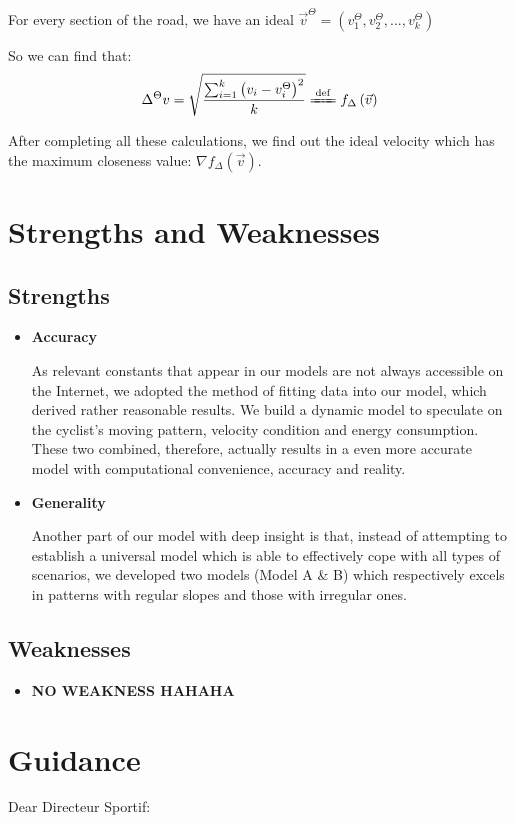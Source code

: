 \documentclass[12pt]{article}
\newcommand{\itembf}{\item \textbf}
\theoremstyle{definition}
\theoremstyle{remark}
\numberwithin{equation}{section}
\begin{document}
	 For every section of the road, we have an ideal $\vec{v}^{\Theta}=\left( v_{1}^{\Theta},v_{2}^{\Theta},...,v_{k}^{\Theta} \right) $
	
	 So we can find that:
	$$\Delta ^{\Theta}v=\sqrt{\frac{\sum_{i=1}^k{\left( v_i-v_{i}^{\Theta} \right) ^2}}{k}}\xlongequal{\mathrm{def}}f_{\Delta}\left( \vec{v} \right) $$
	
	After completing all these calculations, we find out the ideal velocity which has the maximum closeness value: $\nabla f_{\Delta}\left( \vec{v} \right) $.


	\section{Strengths and Weaknesses}
	\subsection*{Strengths}
	\begin{itemize}
		\item \textbf{Accuracy}
		
			As relevant constants that appear in our models are not always accessible on the Internet, we adopted the method of fitting data into our model, which derived rather reasonable results. We build a dynamic model to speculate on the cyclist's moving pattern, velocity condition and energy consumption. These two combined, therefore, actually results in a even more accurate model with computational convenience, accuracy and reality.
		\item \textbf{Generality}

			Another part of our model with deep insight is that, instead of attempting to establish a universal model which is able to effectively cope with all types of scenarios, we developed two models (Model A \& B) which respectively excels in patterns with regular slopes and those with irregular ones. 
	\end{itemize}
	\subsection*{Weaknesses}
	\begin{itemize}
		\itembf{NO WEAKNESS HAHAHA}
	\end{itemize}
	\newpage
	\section{Guidance}
	Dear Directeur Sportif:
\end{document}
